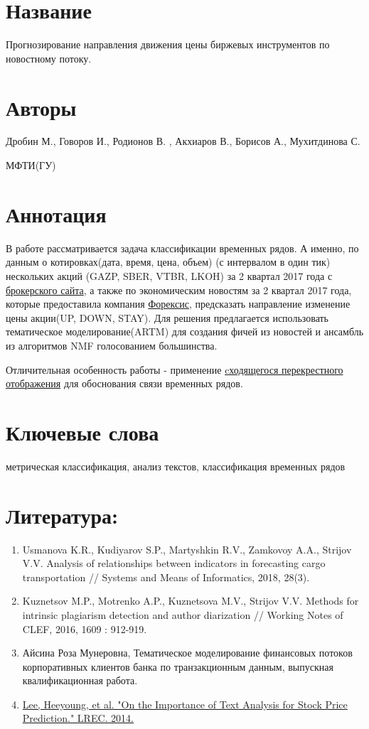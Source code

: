 \documentclass[11pt]{article}
\date{\today}
\title{}
\begin{document}
\tableofcontents

\section{Название}
\label{sec:orgd3af013}
Прогнозирование направления движения цены биржевых инструментов по новостному потоку.

\section{Авторы}
\label{sec:org477b774}
Дробин М., Говоров И., Родионов В. , Акхиаров В., Борисов А., Мухитдинова С.

МФТИ(ГУ)

\section{Аннотация}
\label{sec:orgcf29655}
В работе рассматривается задача классификации временных рядов. А именно, по данным о котировках(дата, время, цена, объем)
(с интервалом в один тик) нескольких акций (GAZP, SBER, VTBR, LKOH) за 2 квартал 2017 года с \href{https://www.finam.ru/}{брокерского сайта}, а
также по экономическим новостям за 2 квартал 2017 года, которые предоставила компания \href{http://www.forecsys.ru/}{Форексис}, предсказать направление изменение
цены акции(UP, DOWN, STAY). Для решения предлагается использовать тематическое моделирование(ARTM) для создания
фичей из новостей и ансамбль из алгоритмов NMF голосованием большинства. 

Отличительная особенность работы - применение \href{http://www.machinelearning.ru/wiki/images/1/11/Usmanova2018CCM\_PLS.pdf}{cходящегося перекрестного отображения} для обоснования связи временных рядов.

\section{Ключевые слова}
\label{sec:orgd7effcb}
метрическая классификация, анализ текстов, классификация временных рядов

\section{Литература:}
\label{sec:org3135f22}
\begin{enumerate}
\item Usmanova K.R., Kudiyarov S.P., Martyshkin R.V., Zamkovoy A.A., Strijov V.V. Analysis of relationships between indicators in forecasting cargo transportation // Systems and Means of Informatics, 2018, 28(3).
\item Kuznetsov M.P., Motrenko A.P., Kuznetsova M.V., Strijov V.V. Methods for intrinsic plagiarism detection and author diarization // Working Notes of CLEF, 2016, 1609 : 912-919.
\item Айсина Роза Мунеровна, Тематическое моделирование финансовых потоков корпоративных клиентов банка по транзакционным данным, выпускная квалификационная работа.
\item \href{https://nlp.stanford.edu/pubs/lrec2014-stock.pdf}{Lee, Heeyoung, et al. "On the Importance of Text Analysis for Stock Price Prediction." LREC. 2014.}
\end{enumerate}
\end{document}
